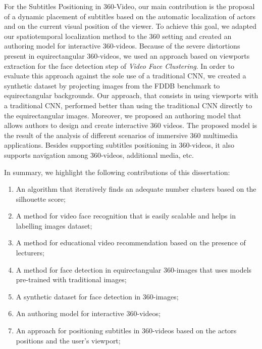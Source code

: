 For the Subtitles Positioning in 360-Video, our main contribution is the proposal of a dynamic placement of subtitles based on the automatic localization of actors and on the current visual position of the viewer. To achieve this goal, we adapted our spatiotemporal localization method to the 360 setting and created an authoring model for interactive 360-videos. Because of the severe distortions present in equirectangular 360-videos, we used an approach based on viewports extraction for the face detection step of \emph{Video Face Clustering}. In order to evaluate this approach against the sole use of a traditional CNN, we created a synthetic dataset by projecting images from the FDDB benchmark to equirectangular backgrounds. Our approach, that consists in using viewports with a traditional CNN, performed better than using the traditional CNN directly to the equirectangular images. Moreover, we proposed an authoring model that allows authors to design and create interactive 360 videos. The proposed model is the result of the analysis of different scenarios of immersive 360 multimedia applications. Besides supporting subtitles positioning in 360-videos, it also supports navigation among 360-videos, additional media, etc. 

In summary, we highlight the following contributions of this dissertation:
\begin{enumerate}
    \item An algorithm that iteratively finds an adequate number clusters based on the silhouette score;
    \item A method for video face recognition that is easily scalable and helps in labelling images dataset;
    \item A method for educational video recommendation based on the presence of lecturers;
    \item A method for face detection in equirectangular 360-images that uses models pre-trained with traditional images;
    \item A synthetic dataset for face detection in 360-images;
    \item An authoring model for interactive 360-videos;
    \item An approach for positioning subtitles in 360-videos based on the actors positions and the user's viewport;
\end{enumerate}

